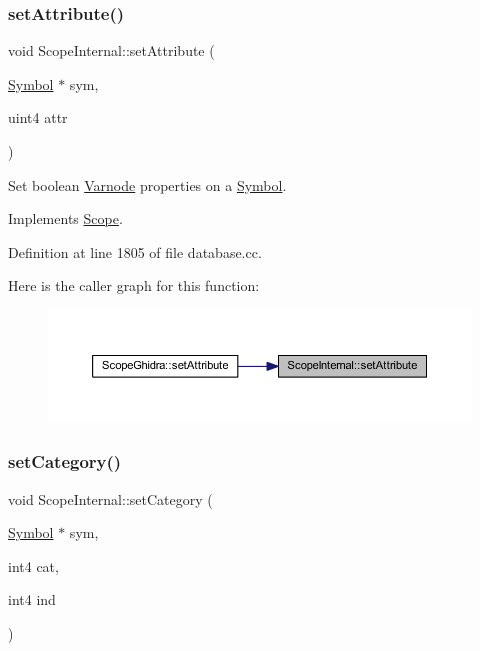 \subsubsection{\texorpdfstring{setAttribute()}{setAttribute()}}
{\footnotesize\ttfamily void Scope\+Internal\+::set\+Attribute (\begin{DoxyParamCaption}\item[{\mbox{\hyperlink{class_symbol}{Symbol}} $\ast$}]{sym,  }\item[{uint4}]{attr }\end{DoxyParamCaption})\hspace{0.3cm}{\ttfamily [virtual]}}



Set boolean \mbox{\hyperlink{class_varnode}{Varnode}} properties on a \mbox{\hyperlink{class_symbol}{Symbol}}. 



Implements \mbox{\hyperlink{class_scope_a7a49f329dcfe47129bf11acac543233e}{Scope}}.



Definition at line 1805 of file database.\+cc.

Here is the caller graph for this function\+:
\nopagebreak
\begin{figure}[H]
\begin{center}
\leavevmode
\includegraphics[width=350pt]{class_scope_internal_a320fb817d3062994cb994e38a45fc0e1_icgraph}
\end{center}
\end{figure}
\mbox{\label{class_scope_internal_aee7ec7a7253a5cdcfa61b88f01e9918d}} 
\subsubsection{\texorpdfstring{setCategory()}{setCategory()}}
{\footnotesize\ttfamily void Scope\+Internal\+::set\+Category (\begin{DoxyParamCaption}\item[{\mbox{\hyperlink{class_symbol}{Symbol}} $\ast$}]{sym,  }\item[{int4}]{cat,  }\item[{int4}]{ind }\end{DoxyParamCaption})\hspace{0.3cm}{\ttfamily [virtual]}}



